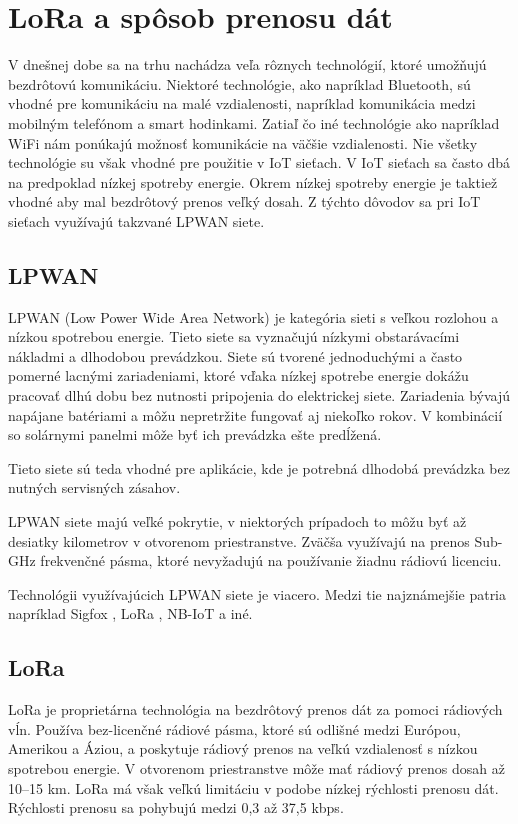 \documentclass[slovak,master]{diploma}
\begin{document}
\chapter{LoRa a spôsob prenosu dát}
V dnešnej dobe sa na trhu nachádza veľa rôznych technológií, ktoré umožňujú bezdrôtovú komunikáciu. Niektoré technológie, ako napríklad Bluetooth, sú vhodné pre komunikáciu na malé 
vzdialenosti, napríklad komunikácia medzi mobilným telefónom a smart hodinkami. Zatiaľ čo iné technológie ako napríklad WiFi nám ponúkajú možnosť komunikácie na väčšie vzdialenosti. 
Nie všetky technológie su však vhodné pre použitie v IoT sieťach. V IoT sieťach sa často dbá na predpoklad nízkej spotreby energie. Okrem nízkej spotreby energie je taktiež vhodné 
aby mal bezdrôtový prenos veľký dosah. Z týchto dôvodov sa pri IoT sieťach využívajú takzvané LPWAN siete.
\section {LPWAN}
LPWAN (Low Power Wide Area Network) je kategória sieti s veľkou rozlohou a nízkou spotrebou energie. Tieto siete sa vyznačujú nízkymi obstarávacími 
nákladmi a dlhodobou prevádzkou. Siete sú tvorené jednoduchými a často pomerné lacnými zariadeniami, ktoré vďaka nízkej spotrebe energie dokážu pracovať dlhú dobu bez 
nutnosti pripojenia do elektrickej siete. Zariadenia bývajú napájane batériami a môžu nepretržite fungovať aj niekoľko rokov. V kombinácií so solárnymi panelmi 
môže byť ich prevádzka ešte predĺžená. 

Tieto siete sú teda vhodné pre aplikácie, kde je potrebná dlhodobá prevádzka bez nutných servisných zásahov.

LPWAN siete majú veľké pokrytie, v niektorých prípadoch to môžu byť až desiatky kilometrov v otvorenom priestranstve. Zväčša využívajú na prenos 
Sub-GHz frekvenčné pásma, ktoré nevyžadujú na používanie žiadnu rádiovú licenciu.

Technológii využívajúcich LPWAN siete je viacero. Medzi tie najznámejšie patria napríklad Sigfox \cite{sigfox}, LoRa \cite{lora}, NB-IoT a iné.

\section {LoRa}
LoRa je proprietárna technológia na bezdrôtový prenos dát za pomoci rádiových vĺn.
Používa bez-licenčné rádiové pásma, ktoré sú odlišné medzi Európou, Amerikou a Áziou, a poskytuje rádiový prenos na veľkú vzdialenosť s nízkou spotrebou energie.
V otvorenom priestranstve môže mať rádiový prenos dosah až 10--15 km. LoRa má však veľkú limitáciu v podobe nízkej rýchlosti prenosu dát.
Rýchlosti prenosu sa pohybujú medzi 0,3 až 37,5 kbps.
\end{document}
